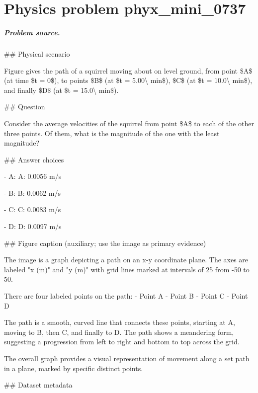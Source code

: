 
\chapter{Physics problem phyx\_mini\_0737}
\label{ch:PhyXMiniProblems_problem_phyx_mini_0737}

\paragraph{Problem source.}
\#\# Physical scenario

Figure gives the path of a squirrel moving about on level ground, from point \$A\$ (at time \$t = 0\$), to points \$B\$ (at \$t = 5.00\textbackslash{} min\$), \$C\$ (at \$t = 10.0\textbackslash{} min\$), and finally \$D\$ (at \$t = 15.0\textbackslash{} min\$).

\#\# Question

Consider the average velocities of the squirrel from point \$A\$ to each of the other three points. Of them, what is the magnitude of the one with the least magnitude?

\#\# Answer choices

- A: A: 0.0056 m/s

- B: B: 0.0062 m/s

- C: C: 0.0083 m/s

- D: D: 0.0097 m/s

\#\# Figure caption (auxiliary; use the image as primary evidence)

The image is a graph depicting a path on an x-y coordinate plane. The axes are labeled "x (m)" and "y (m)" with grid lines marked at intervals of 25 from -50 to 50. 

There are four labeled points on the path:
- Point A
- Point B
- Point C
- Point D

The path is a smooth, curved line that connects these points, starting at A, moving to B, then C, and finally to D. The path shows a meandering form, suggesting a progression from left to right and bottom to top across the grid.

The overall graph provides a visual representation of movement along a set path in a plane, marked by specific distinct points.

\#\# Dataset metadata

